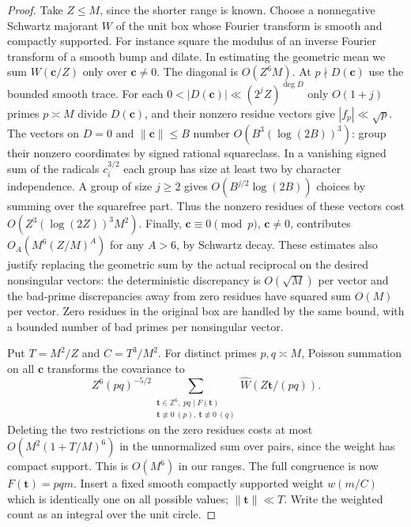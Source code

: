 \documentclass[11pt,letterpaper]{article}
\theoremstyle{definition}
\begin{document}
\begin{proof}
Take $Z\le M$, since the shorter range is known. Choose a
nonnegative Schwartz majorant $W$ of the unit box whose Fourier
transform is smooth and compactly supported. For instance square
the modulus of an inverse Fourier transform of a smooth bump and
dilate. In estimating the geometric mean we sum $W(\mathbf c/Z)$
only over $\mathbf c\ne0$. The diagonal is $O(Z^6M)$.
At $p\nmid D(\mathbf c)$ use the bounded smooth trace. For each
$0<|D(\mathbf c)|\ll(2^jZ)^{\deg D}$ only $O(1+j)$ primes
$p\asymp M$ divide $D(\mathbf c)$, and their nonzero residue
vectors give $|f_p|\ll\sqrt p$. The vectors on $D=0$ and
$\|\mathbf c\|\le B$ number $O(B^3(\log(2B))^3)$: group their
nonzero coordinates by signed rational squareclass. In a vanishing
signed sum of the radicals $c_i^{3/2}$ each group has size at least
two by character independence. A group of size $j\ge2$ gives
$O(B^{j/2}\log(2B))$ choices by summing over the squarefree part.
Thus the nonzero residues of these vectors cost
$O(Z^3(\log(2Z))^3 M^2)$. Finally, $\mathbf c\equiv0\pmod p$,
$\mathbf c\ne0$, contributes
$O_A(M^6(Z/M)^A)$ for any $A>6$, by Schwartz decay.
These estimates also justify replacing the geometric sum by the
actual reciprocal on the desired nonsingular vectors:
the deterministic discrepancy is $O(\sqrt M)$ per vector and
the bad-prime discrepancies away from zero residues have squared
sum $O(M)$ per vector. Zero residues in the original box are
handled by the same bound, with a bounded number of bad primes
per nonsingular vector.

Put $T=M^2/Z$ and $C=T^3/M^2$. For distinct primes $p,q\asymp M$,
Poisson summation on all $\mathbf c$ transforms the covariance to
\[
 Z^6(pq)^{-5/2}
 \sum_{\substack{\mathbf t\in\mathbb Z^6,\ pq\mid F(\mathbf t)\\
          \mathbf t\not\equiv0\ (p),\ \mathbf t\not\equiv0\ (q)}}
                \widehat W(Z\mathbf t/(pq)).
\]
Deleting the two restrictions on the zero residues costs at most
$O(M^2(1+T/M)^6)$ in the unnormalized sum over pairs, since the
weight has compact support. This is $O(M^6)$ in our ranges.
The full congruence is now $F(\mathbf t)=pqm$. Insert a fixed
smooth compactly supported weight $w(m/C)$ which is identically
one on all possible values; $\|\mathbf t\|\ll T$.
Write the weighted count as an integral over the unit circle.


\end{proof}
\end{document}
